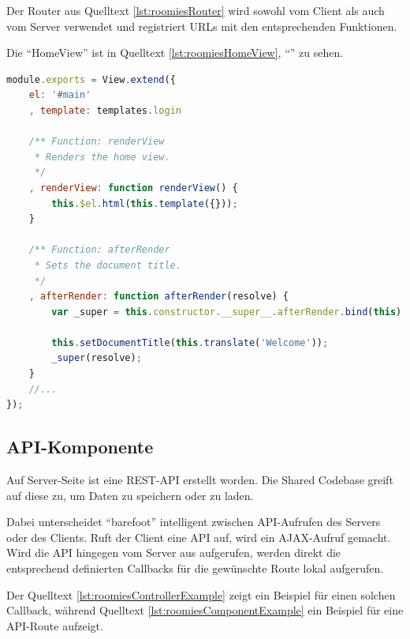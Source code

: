 Der Router aus Quelltext \ref{lst:roomiesRouter} wird sowohl vom Client als auch vom Server verwendet und registriert URLs mit den entsprechenden Funktionen.

Die ``HomeView'' ist in Quelltext \ref{lst:roomiesHomeView}, ``'' zu sehen.

\begin{lstlisting}[language=JavaScript, caption=Ausschnitt aus HomeView der Beispielapplikation \cite{roomiesHomeView}, label=lst:roomiesHomeView, firstnumber=7]
module.exports = View.extend({
	el: '#main'
	, template: templates.login

	/** Function: renderView
	 * Renders the home view.
	 */
	, renderView: function renderView() {
		this.$el.html(this.template({}));
	}

	/** Function: afterRender
	 * Sets the document title.
	 */
	, afterRender: function afterRender(resolve) {
		var _super = this.constructor.__super__.afterRender.bind(this);

		this.setDocumentTitle(this.translate('Welcome'));
		_super(resolve);
	}
	//...
});
\end{lstlisting}

\subsection{API-Komponente}
Auf Server-Seite ist eine REST-API \cite{REST} erstellt worden. Die Shared Codebase greift auf diese zu, um Daten zu speichern oder zu laden.

Dabei unterscheidet ``barefoot'' intelligent zwischen API-Aufrufen des Servers oder des Clients.
Ruft der Client eine API auf, wird ein AJAX-Aufruf gemacht. Wird die API
hingegen vom Server aus aufgerufen, werden direkt die entsprechend definierten
Callbacks für die gewünschte Route lokal aufgerufen.

Der Quelltext \ref{lst:roomiesControllerExample} zeigt ein Beispiel für einen solchen
Callback, während Quelltext \ref{lst:roomiesComponentExample} ein Beispiel für
eine API-Route aufzeigt.

